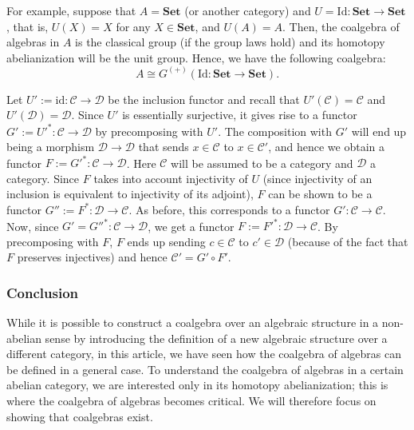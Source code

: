 \documentclass[a4paper,reqno,oneside]{article}
\begin{document}
For example, suppose that $A = \mathbf{Set}$ (or another category) and $U = \mathrm{Id}: \mathbf{Set} \to \mathbf{Set}$, that is, $U(X) = X$ for any $X \in \mathbf{Set}$, and $U(A) = A$. Then, the coalgebra of algebras in $A$ is the classical group (if the group laws hold) and its homotopy abelianization will be the unit group. Hence, we have the following coalgebra:
$$A \cong G^{(+)}(\mathrm{Id}: \mathbf{Set} \to \mathbf{Set}).$$

Let $U' := \mathrm{id}: \mathcal{C} \to \mathcal{D}$ be the inclusion functor and recall that $U'(\mathcal{C}) = \mathcal{C}$ and $U'(\mathcal{D}) = \mathcal{D}$. Since $U'$ is essentially surjective, it gives rise to a functor $G' := U'^\ast: \mathcal{C} \to \mathcal{D}$ by precomposing with $U'$. The composition with $G'$ will end up being a morphism $\mathcal{D} \to \mathcal{D}$ that sends $x \in \mathcal{C}$ to $x \in \mathcal{C'}$, and hence we obtain a functor $F := G'^\ast: \mathcal{C} \to \mathcal{D}$. Here $\mathcal{C}$ will be assumed to be a category and $\mathcal{D}$ a category. Since $F$ takes into account injectivity of $U$ (since injectivity of an inclusion is equivalent to injectivity of its adjoint), $F$ can be shown to be a functor $G'' := F^\ast: \mathcal{D} \to \mathcal{C}$. As before, this corresponds to a functor $G': \mathcal{C} \to \mathcal{C}$. Now, since $G' = G''^\ast: \mathcal{C} \to \mathcal{D}$, we get a functor $F := F'^\ast: \mathcal{D} \to \mathcal{C}$. By precomposing with $F$, $F$ ends up sending $c \in \mathcal{C}$ to $c' \in \mathcal{D}$ (because of the fact that $F$ preserves injectives) and hence $\mathcal{C}' = G' \circ F'$.

\subsubsection{Conclusion}

While it is possible to construct a coalgebra over an algebraic structure in a non-abelian sense by introducing the definition of a new algebraic structure over a different category, in this article, we have seen how the coalgebra of algebras can be defined in a general case. To understand the coalgebra of algebras in a certain abelian category, we are interested only in its homotopy abelianization; this is where the coalgebra of algebras becomes critical. We will therefore focus on showing that coalgebras exist.
\end{document}
